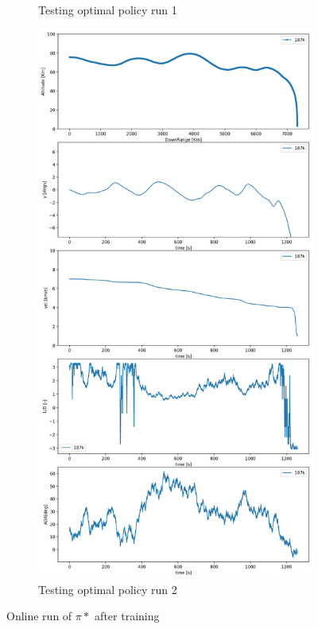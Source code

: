 \documentclass[11pt]{article} %
\begin{document}
\begin{figure}[H]
\begin{subfigure}[b]{0.5\textwidth}
     \caption{Testing optimal policy run 1}  
     \label{fig:run_81}
   \end{subfigure}
   \begin{subfigure}[b]{0.5\textwidth}
     \centering
     \includegraphics[width=\textwidth]{images/run8_explore2.png}
     \caption{ Testing optimal policy run 2}
     \label{fig:run_82}

   \end{subfigure}

   \caption{Online run of $\pi*$ after training}
   \label{fig:run_data_plots}

\end{figure}
\end{document}
